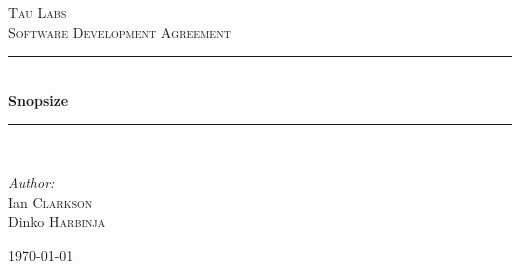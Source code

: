 \begin{titlepage}

\newcommand{\HRule}{\rule{\linewidth}{0.5mm}}

\begin{center}


\textsc{\LARGE Tau Labs}\\[1.5cm]

\textsc{\Large Software Development Agreement}\\[0.5cm]

\HRule \\[0.4cm]
{ \huge \bfseries Snopsize}\\[0.4cm]
\HRule \\[1.5cm]

\begin{minipage}{0.4\textwidth}
\begin{flushleft} \large
\emph{Author:}\\
Ian \textsc{Clarkson} \\
Dinko \textsc{Harbinja} 
\end{flushleft}
\end{minipage}

\vfill

{\large \today}

\end{center}

\end{titlepage}